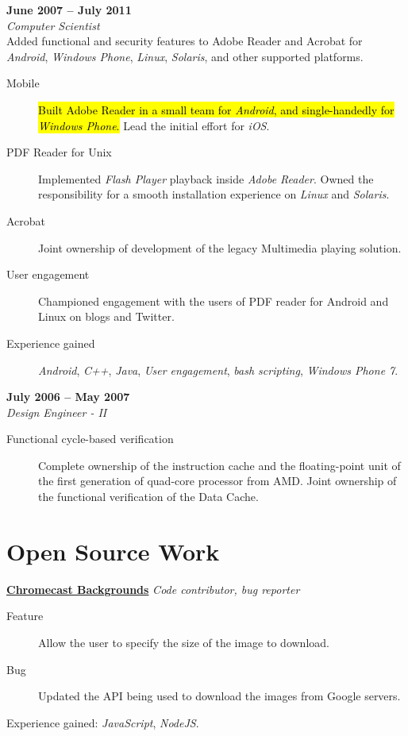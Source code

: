 \documentclass[margin,line]{resume}
\begin{document}
\begin{resume}
	 \hfill \textbf{June 2007 -- July 2011}\\
	\textsl{Computer Scientist}\\
	Added functional and security features to Adobe Reader and Acrobat for \textit{Android}, \textit{Windows Phone}, \textit{Linux}, \textit{Solaris}, and other supported platforms.
	\begin{description}
	\item [Mobile] \hl{Built Adobe Reader in a small team for \textit{Android}, and single-handedly for \textit{Windows Phone}.} Lead the initial effort for \textit{iOS}.
	\item [PDF Reader for Unix] Implemented \textit{Flash Player} playback inside \textit{Adobe Reader}. Owned the responsibility for a smooth installation experience on \textit{Linux} and \textit{Solaris}.
	\item [Acrobat] Joint ownership of development of the legacy Multimedia playing solution.
	\item [User engagement] Championed engagement with the users of PDF reader for Android and Linux on blogs and Twitter.
	\item [Experience gained] \textit{Android}, \textit{C++}, \textit{Java}, \textit{User engagement}, \textit{bash scripting}, \textit{Windows Phone 7}.
    \end{description}

	 \hfill \textbf{July 2006 -- May 2007}\\
	\textsl{Design Engineer - II}\\
	\begin{description}
	\item [Functional cycle-based verification] Complete ownership of the instruction cache and the floating-point unit of the first generation of quad-core processor from AMD. Joint ownership of the functional verification of the Data Cache.
    \end{description}
	\vfill \break

	\section{Open Source Work}

	\textbf{\href{https://github.com/aawc/Chromecast-Backgrounds}{Chromecast Backgrounds}} \hfill \textsl{Code contributor, bug reporter}\\
	\begin{description}
    \item[Feature] Allow the user to specify the size of the image to download.
    \item[Bug] Updated the API being used to download the images from Google servers.
    \end{description}
	Experience gained: \textit{JavaScript}, \textit{NodeJS}.


\end{resume}
\end{document}
